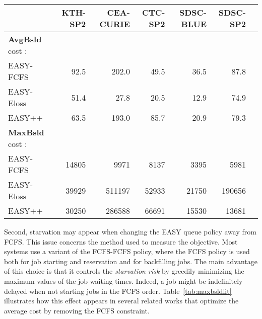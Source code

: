 

\begin{table*}[ht!]
  \centering

  \caption{\textbf{AvgBsld} and \textbf{MaxBsld} of two "statistical" EASY
  Policies versus EASY-FCFS-FCFS. This is a single-run experiment on the
initial workload logs described in Section\ref{sec:expe}.}

  \label{tab:maxbsldlit}
  \begin{tabular}{lrrrrrr}
    \hline
                                      & KTH-SP2 & CEA-CURIE & CTC-SP2 & SDSC-BLUE & SDSC-SP2 \\
    \hline
    \textbf{AvgBsld} cost :           &         &           &         &           &          \\
    \hline
    EASY-FCFS                         & 92.5    & 202.0     & 49.5    & 36.5      & 87.8     \\
    EASY-Eloss\cite{learningruntimes} & 51.4    & 27.8      & 20.5    & 12.9      & 74.9     \\
    EASY++\cite{Tsafrir_easypp_2005}  & 63.5    & 193.0     & 85.7    & 20.9      & 79.3     \\
    \hline
    \textbf{MaxBsld} cost :           &         &           &         &           &          \\
    \hline
    EASY-FCFS                         & 14805   & 9971      & 8137    & 3395      & 5981     \\
    EASY-Eloss                        & 39929   & 511197    & 52933   & 21750     & 190656   \\
    EASY++                            & 30250   & 286588    & 66691   & 15530     & 13681    \\
    \hline
  \end{tabular}
\end{table*}

Second, starvation may appear when changing the EASY queue policy away
from FCFS. This issue concerns the method used to measure the objective. Most
systems use a variant of the FCFS-FCFS policy, where the FCFS policy is used
both for job starting and reservation and for backfilling jobs. The main
advantage of this choice is that it controls the \textit{starvation risk} by
greedily minimizing the maximum values of the job waiting times.
Indeed, a job might be indefinitely delayed when not starting jobs in the FCFS
order. Table~\ref{tab:maxbsldlit} illustrates how this effect appears in
several related works \cite{Tsafrir_easypp_2005,learningruntimes} that optimize
the average cost by removing the FCFS constraint.

